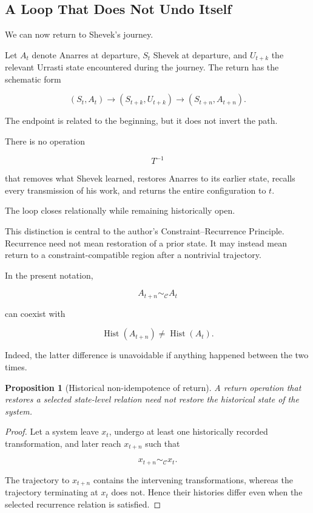 \documentclass[
  11pt,
  a4paper,
  DIV=12,
  BCOR=0mm,
  parskip=half-
]{scrartcl}
\newcommand{\simconstraint}{\sim_{\mathcal C}}
\newcommand{\Hist}{\operatorname{Hist}}
\theoremstyle{definition}
\theoremstyle{plain}
\newtheorem{proposition}[definition]{Proposition}
\theoremstyle{remark}
\begin{document}
\subsection{A Loop That Does Not Undo Itself}
\label{sec:noninverse-loop}

We can now return to Shevek's journey.

Let \(A_t\) denote Anarres at departure, \(S_t\) Shevek at departure, and
\(U_{t+k}\) the relevant Urrasti state encountered during the journey. The
return has the schematic form

\[
  (S_t,A_t)
  \longrightarrow
  (S_{t+k},U_{t+k})
  \longrightarrow
  (S_{t+n},A_{t+n}).
\]

The endpoint is related to the beginning, but it does not invert the path.

There is no operation

\[
  T^{-1}
\]

that removes what Shevek learned, restores Anarres to its earlier state,
recalls every transmission of his work, and returns the entire configuration
to \(t\).

The loop closes relationally while remaining historically open.

This distinction is central to the author's Constraint--Recurrence Principle.
Recurrence need not mean restoration of a prior state. It may instead mean
return to a constraint-compatible region after a nontrivial trajectory.

In the present notation,

\[
  A_{t+n}\simconstraint A_t
\]

can coexist with

\[
  \Hist(A_{t+n})\neq\Hist(A_t).
\]

Indeed, the latter difference is unavoidable if anything happened between the
two times.

\begin{proposition}[Historical non-idempotence of return]
\label{prop:historical-nonidempotence}
A return operation that restores a selected state-level relation need not
restore the historical state of the system.
\end{proposition}

\begin{proof}
Let a system leave \(x_t\), undergo at least one historically recorded
transformation, and later reach \(x_{t+n}\) such that

\[
  x_{t+n}\sim_{\mathcal C}x_t.
\]

The trajectory to \(x_{t+n}\) contains the intervening transformations,
whereas the trajectory terminating at \(x_t\) does not. Hence their histories
differ even when the selected recurrence relation is satisfied.
\end{proof}
\end{document}
